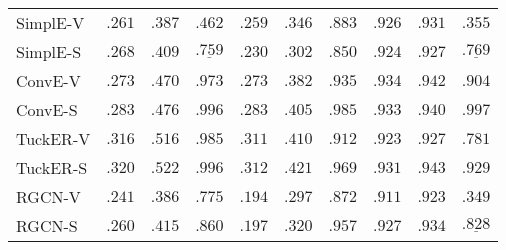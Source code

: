 \documentclass[letterpaper]{article} %
\begin{document}
\begin{table*}[h]
\begin{tabular}{lccccccccc}
    \hline
                SimplE-V &
    $.261$&$.387$&$.462$& $\mathbf{.259}$&$\mathbf{.346}$&$\mathbf{.883}$& $\mathbf{.926}$&$\mathbf{.931}$&$.355$ \\
                SimplE-S &
    $\mathbf{.268}$&$\mathbf{.409}$&$\underline{\mathbf{.759}}$& $.230$&$.302$&$.850$& $.924$&$.927$&$\underline{\mathbf{.769}}$ \\
    \hline
				ConvE-V &
    $.273$&$.470$&$.973$& $.273$&$.382$&$.935$& $\mathbf{.934}$&$\mathbf{.942}$&$.904$ \\
				ConvE-S &
    $\mathbf{.283}$&$\mathbf{.476}$&$\mathbf{.996}$& $\mathbf{.283}$&$\mathbf{.405}$&$\mathbf{.985}$& $.933$&$.940$&$\mathbf{.997}$  \\
    \hline
    			TuckER-V &
    $.316$&$.516$&$.985$& $.311$&$.410$&$.912$& $.923$&$.927$&$.781$ \\
                TuckER-S &
    $\mathbf{.320}$&$\mathbf{.522}$&$\mathbf{.996}$& $\mathbf{.312}$&$\mathbf{.421}$&$\mathbf{.969}$& $\mathbf{.931}$&$\mathbf{.943}$&$\mathbf{.929}$ \\
    \hline
                RGCN-V &
    $.241$&$.386$&$.775$& $.194$&$.297$&$.872$& $.911$&$.923$&$.349$ \\
                RGCN-S &
    $\mathbf{.260}$&$\mathbf{.415}$&$\mathbf{.860}$& $\mathbf{.197}$&$\mathbf{.320}$&$\mathbf{.957}$& $\mathbf{.927}$&$\mathbf{.934}$&$\underline{\mathbf{.828}}$ \\
    \hline
			\end{tabular}
 \end{table*}
\end{document}
